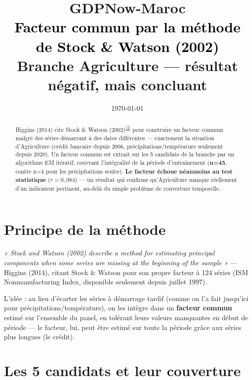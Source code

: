 \documentclass[11pt,a4paper]{article}
\title{\vspace{-1.3cm}\textcolor{bleuprincip}{\Huge\bfseries GDPNow-Maroc}\\[0.3cm]
\textcolor{black}{\Large Facteur commun par la méthode de Stock \& Watson (2002)}\\[0.15cm]
\textcolor{orangealerte}{\large Branche Agriculture --- résultat négatif, mais concluant}}
\author{}
\date{\today}
\newcommand{\cit}[1]{\textsuperscript{\hyperlink{ref#1}{[#1]}}}
\begin{document}
\maketitle
\thispagestyle{empty}

\begin{abstract}
\noindent Higgins (2014) cite Stock \& Watson (2002)\cit{1} pour construire un facteur commun malgré des séries démarrant à des dates différentes --- exactement la situation d'Agriculture (crédit bancaire depuis 2006, précipitations/température seulement depuis 2020). Un facteur commun est extrait sur les 5 candidats de la branche par un algorithme EM itératif, couvrant l'intégralité de la période d'entraînement (\textbf{n=45}, contre n=4 pour les précipitations seules). \textbf{Le facteur échoue néanmoins au test statistique} ($r=0{,}084$) --- un résultat qui confirme qu'Agriculture manque réellement d'un indicateur pertinent, au-delà du simple problème de couverture temporelle.
\end{abstract}

\tableofcontents
\vspace{0.3cm}

\section{Principe de la méthode}

\begin{noteboxbleu}
\textit{« Stock and Watson (2002) describe a method for estimating principal components when some series are missing at the beginning of the sample »} --- Higgins (2014), citant Stock \& Watson pour son propre facteur à 124 séries (ISM Nonmanufacturing Index, disponible seulement depuis juillet 1997).
\end{noteboxbleu}

L'idée : au lieu d'écarter les séries à démarrage tardif (comme on l'a fait jusqu'ici pour précipitations/température), on les intègre dans un \textbf{facteur commun} estimé sur l'ensemble du panel, en tolérant leurs valeurs manquantes en début de période --- le facteur, lui, peut être estimé sur toute la période grâce aux séries plus longues (le crédit).

\section{Les 5 candidats et leur couverture}
\end{document}
